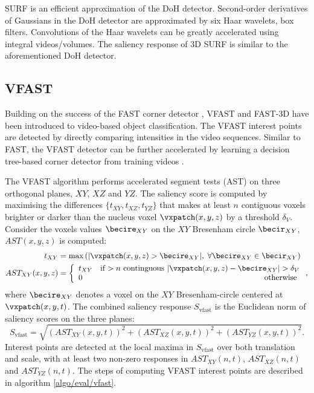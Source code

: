 SURF is an efficient approximation of the DoH detector. Second-order derivatives of Gaussians in the DoH detector are approximated by six Haar wavelets, \ie box filters. Convolutions of the Haar wavelets can be greatly accelerated using integral videos/volumes. The saliency response of 3D SURF is similar to the aforementioned DoH detector. 

\subsection{VFAST}
\label{sec/eval/vfast}

Building on the success of the FAST corner detector \cite{Rosten2010}, VFAST \cite{Yu2010} and FAST-3D \cite{Koelstra2009} have been introduced to video-based object classification. 
The VFAST interest points are detected by directly comparing intensities in the video sequences. Similar to FAST, the VFAST detector can be further accelerated by learning a decision tree-based corner detector from training videos \cite{Rosten2010}. 

The VFAST algorithm performs accelerated segment tests (AST) on three orthogonal planes, $XY$, $XZ$ and $YZ$. The saliency score is computed by maximising the differences $\{ t_{XY}, t_{XZ}, t_{YZ} \}$ that makes at least $n$ contiguous voxels brighter or darker than the nucleus voxel $\vxpatch(x,y,z)$ by a threshold $\delta_{V}$. Consider the voxels values $\becire_{XY}$ on the $XY$ Bresenham circle $\becir_{XY}$, $AST(x,y,z)$ is computed:  
\begin{align}
	t_{XY} & = \max\left(| \vxpatch(x,y,z) > \becire_{XY}|,\;\forall \becire_{XY} \in \becir_{XY} \right)\\ 
AST_{XY}(x,y,z) & = \left\{
\begin{array}{lr}
	t_{XY} & \mbox{if $> n$ continguous } |\vxpatch(x,y,z) - \becire_{XY}| > \delta_{V} \\
	0 & \mbox{ otherwise }
\end{array}
\right.,
\label{eqn/eval/fastast}
\end{align}
where $\becire_{XY}$ denotes a voxel on the $XY$ Bresenham-circle centered at $\vxpatch(x,y,t)$. The combined saliency response $S_{\textrm{vfast}}$ is the Euclidean norm of saliency scores on the three planes: 
\begin{equation}
S_\textrm{vfast} = \sqrt{ \left(AST_{XY}(x,y,t)\right)^2+ \left(AST_{XZ}(x,y,t)\right)^2+ \left(AST_{YZ}(x,y,t)\right)^2}.
\label{eqn/eval/fastverall}
\end{equation}
Interest points are detected at the local maxima in $S_{\textrm{vfast}}$ over both translation and scale, with at least two non-zero responses in $AST_{XY}(n,t)$, $AST_{XZ}(n,t)$ and $AST_{YZ}(n,t)$. The steps of computing VFAST interest points are described in algorithm \ref{algo/eval/vfast}. 

